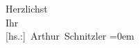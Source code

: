 \pstart
           Herzlichst{\\[\baselineskip]}Ihr{\\[\baselineskip]}\spacefill\mbox{{[}hs.:{]} Arthur Schnitzler}\pend
           \leftskip=0em{}\endnumbering{}
\begin{anhang}
\end{anhang}
      